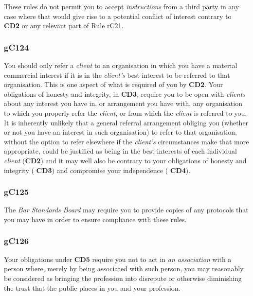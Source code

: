 These rules do not permit you to accept \emph{instructions} from a third
party in any case where that would give rise to a potential conflict of
interest contrary to \textbf{\textcolor{mygold}{CD2}} or any relevant part of Rule rC21.

\subsubsection{\color{darkgrey}gC124}

You should only refer a \emph{client} to an organisation in which you
have a material commercial interest if it is in the \emph{client's} best
interest to be referred to that organisation. This is one aspect of what
is required of you by \textbf{\textcolor{mygold}{CD2}}. Your obligations of honesty and integrity, in
 \textbf{\textcolor{mygold}{CD3}}, require you to be open with \emph{clients} about any interest you
have in, or arrangement you have with, any organisation to which you
properly refer the \emph{client}, or from which the \emph{client} is
referred to you. It is inherently unlikely that a general referral
arrangement obliging you (whether or not you have an interest in such
organisation) to refer to that organisation, without the option to refer
elsewhere if the \emph{client's} circumstances make that more
appropriate, could be justified as being in the best interests of each
individual \emph{client} (\textcolor{mygold}{\textbf{CD2}}) and it may well also be contrary to your
obligations of honesty and integrity ( \textbf{\textcolor{mygold}{CD3}}) and compromise your
independence ( \textbf{\textcolor{mygold}{CD4}}).

\subsubsection{\color{darkgrey}gC125}

The \emph{Bar Standards Board} may require you to provide copies of any
protocols that you may have in order to ensure compliance with these
rules.

\subsubsection{\color{darkgrey}gC126}

Your obligations under  \textbf{\textcolor{mygold}{CD5}} require you not to act in \emph{an
association} with a person where, merely by being associated with such
person, you may reasonably be considered as bringing the profession into
disrepute or otherwise diminishing the trust that the public places in
you and your profession.

